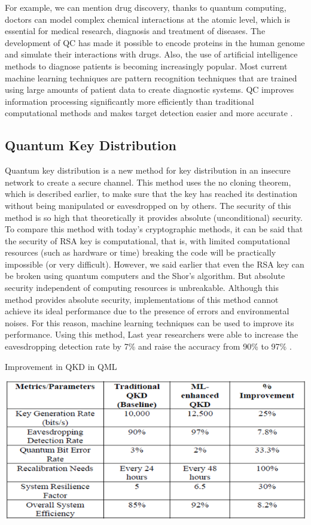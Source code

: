 \documentclass[conference]{IEEEtran}
\begin{document}
For example, we can mention drug discovery, thanks to quantum computing, doctors can model complex chemical interactions at the atomic level, which is essential for medical research, diagnosis and treatment of diseases. The development of QC has made it possible to encode proteins in the human genome and simulate their interactions with drugs. Also, the use of artificial intelligence methods to diagnose patients is becoming increasingly popular. Most current machine learning techniques are pattern recognition techniques that are trained using large amounts of patient data to create diagnostic systems. QC improves information processing significantly more efficiently than traditional computational methods and makes target detection easier and more accurate \cite{b29}.

\subsection{Quantum Key Distribution}
Quantum key distribution is a new method for key distribution in an insecure network to create a secure channel. This method uses the no cloning theorem, which is described earlier, to make sure that the key has reached its destination without being manipulated or eavesdropped on by others. The security of this method is so high that theoretically it provides absolute (unconditional) security. To compare this method with today's cryptographic methods, it can be said that the security of RSA key is computational, that is, with limited computational resources (such as hardware or time) breaking the code will be practically impossible (or very difficult). However, we said earlier that even the RSA key can be broken using quantum computers and the Shor’s algorithm. But absolute security independent of computing resources is unbreakable. Although this method provides absolute security, implementations of this method cannot achieve its ideal performance due to the presence of errors and environmental noises. For this reason, machine learning techniques can be used to improve its performance. Using this method, Last year researchers were able to increase the eavesdropping detection rate by 7\% and raise the accuracy from 90\% to 97\% \cite{b30}.

\begin{table}[htbp]
	\caption{Improvement in QKD in QML \cite{b30}}
	\centerline{\includegraphics[scale=0.65]{qkd.png}}
	\label{table5}
\end{table}
\end{document}
